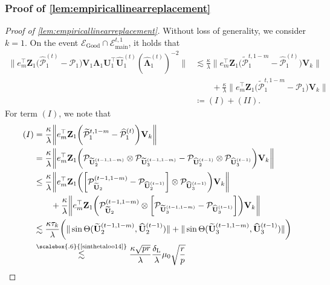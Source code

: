 \documentclass[10pt]{article}
\newcommand{\0}{{\mathbf{0}}}
\newcommand{\1}{{\mathbf{1}}}
\newcommand{\U}{{\mathbf{U}}}
\renewcommand{\t}{^{\top}}
\newcommand{\utilde}{\mathbf{\tilde{U}}}
\newcommand{\uhat}{\mathbf{\hat{U}}}
\newcommand{\dl}{\delta_{\mathrm{L}}}
\renewcommand{\tilde}{\widetilde}
\renewcommand{\hat}{\widehat}
\renewcommand{\hat}{\widehat}
\begin{document}
\subsubsection{Proof of \cref{lem:empiricallinearreplacement}}
\begin{proof}[Proof of \cref{lem:empiricallinearreplacement}]
Without loss of generality, we consider $k = 1$.  On the event $\mathcal{E}_{\mathrm{Good}} \cap \mathcal{E}_{\mathrm{main}}^{t,1}$, it holds that
\begin{align*}
    \bigg\| e_m\t \mathbf{Z}_1 \bigg( \mathcal{\hat P}_1^{(t)} -  \mathcal{P}_1 \bigg) \mathbf{V}_1 \mathbf{\Lambda}_1 \U_1\t \uhat_1^{(t)}  (\mathbf{\hat\Lambda}_1^{(t)})^{-2} \bigg\| &\lesssim \frac{\kappa}{\lambda} \bigg\| e_m\t \mathbf{Z}_1 \bigg( \mathcal{\tilde P}_{1}^{t,1-m} - \mathcal{\hat P}_1^{(t)} \bigg) \mathbf{V}_k \bigg\| \\
    &\qquad + \frac{\kappa}{\lambda} \bigg\| e_m\t \mathbf{Z}_1 \bigg( \mathcal{\tilde P}_{1}^{t,1-m} - \mathcal{ P}_1 \bigg) \mathbf{V}_k \bigg\| \\
    &\coloneqq (I) + (II).
\end{align*}
For term $(I)$, we note that
\begin{align*}
    (I) &= \frac{\kappa}{\lambda} \bigg\| e_m\t \mathbf{Z}_1 \bigg( \mathcal{\tilde P}_{1}^{t,1-m} - \mathcal{\hat P}_1^{(t)} \bigg) \mathbf{V}_k \bigg\| \\
    &= \frac{\kappa}{\lambda} \bigg\| e_m\t \mathbf{Z}_1 \bigg( \mathcal{P}_{\utilde_2^{(t-1,1-m)}} \otimes \mathcal{P}_{\utilde_3^{(t-1,1-m)}} - \mathcal{P}_{\uhat_2^{(t-1)}} \otimes \mathcal{P}_{\uhat_3^{(t-1)}} \bigg) \mathbf{V}_k \bigg\| \\
    &\leq \frac{\kappa}{\lambda} \bigg\| e_m\t \mathbf{Z}_1 \bigg( \bigg[\mathcal{P}_{\utilde_2}^{(t-1,1-m)} - \mathcal{P}_{\uhat_2^{(t-1)}} \bigg] \otimes \mathcal{P}_{\uhat_3^{(t-1)}} \bigg) \mathbf{V}_k \bigg\| \\
    &\qquad + \frac{\kappa}{\lambda} \bigg\| e_m\t \mathbf{Z}_1 \bigg( \mathcal{P}_{\utilde_2}^{(t-1,1-m)} \otimes \bigg[  \mathcal{P}_{\utilde_3^{(t-1,1-m)}} -  \mathcal{P}_{\uhat_3^{(t-1)}} \bigg]\bigg) \mathbf{V}_k \bigg\| \\
    &\lesssim \frac{\kappa \tau_k}{\lambda}  \bigg(\| \sin\Theta(\utilde_2^{(t-1,1-m)},\uhat_2^{(t-1)}) \|  + \| \sin\Theta(\utilde_3^{(t-1,1-m)},\uhat_3^{(t-1)}) \| \bigg) \\
    &\overset{\scalebox{.6}{\text{\cref{sinthetaloo14}}}}{\lesssim} \frac{\kappa \sqrt{pr}}{\lambda} \frac{\dl}{\lambda} \mu_0 \sqrt{\frac{r}{p}}\\

\end{align*}
\end{proof}
\end{document}
